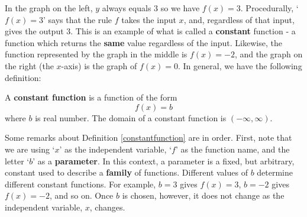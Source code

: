 \documentclass{ximera}
\begin{document}
\begin{image}
\end{image}
\begin{center}
\end{center}

In the graph on the left, $y$ always equals $3$ so we have $f(x) = 3$.  Procedurally, `$f(x) = 3$' says that the rule $f$ takes the input $x$, and, regardless of that input, gives the output $3$.  This is an example of what is called a \textbf{constant} function - a function which returns the \textbf{same} value regardless of the input.  Likewise, the function represented by the graph in the middle is $f(x) = -2$, and the graph on the right (the $x$-axis) is the graph of $f(x) = 0$.  In general, we have the following definition:

\begin{definition} \label{constantfunction} A \textbf{constant function} is a function of the form \[ f(x) =  b\] where $b$ is real number.  The domain of a constant function is $(-\infty, \infty)$.
\end{definition}

Some remarks about  Definition \ref{constantfunction} are in order.   First, note that we are using `$x$' as the independent variable, `$f$' as the function name, and  the letter `$b$' as a  \textbf{parameter}.  In this context, a parameter is a fixed, but arbitrary, constant used to describe a \textbf{family} of functions.  Different values of $b$ determine different constant functions.  For example, $b = 3$ gives $f(x) = 3$, $b = -2$ gives $f(x) = -2$, and so on.  Once $b$ is chosen, however, it does not change as the independent variable, $x$, changes. 
\end{document}
